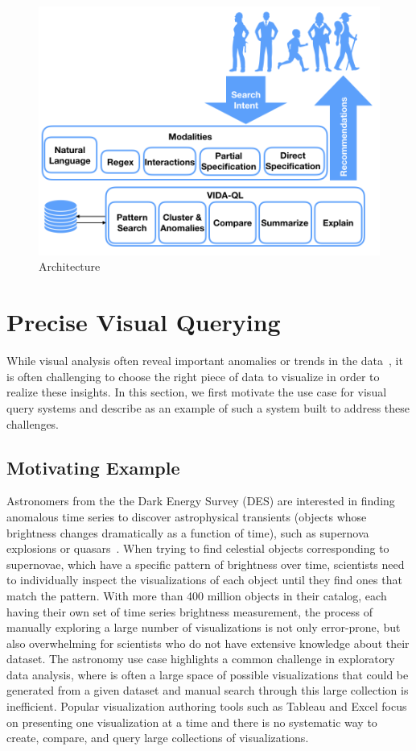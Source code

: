 \begin{figure}[h!]
\label{fig:cycle}
\centering
\includegraphics[width=0.5\linewidth]{figures/VIDA_architecture.png}
\caption{\vida Architecture}
\end{figure}
\section{Precise Visual Querying}\label{sec:precise}
While visual analysis often reveal important anomalies or trends in the data~\cite{Heer2012,Morton2014}, it is often challenging to choose the right piece of data to visualize in order to realize these insights. In this section, we first motivate the use case for visual query systems and describe \zv as an example of such a system built to address these challenges.
\subsection{Motivating Example}
Astronomers from the the Dark Energy Survey (DES) are interested in finding anomalous time series to discover astrophysical transients (objects whose brightness changes dramatically as a function of time), such as supernova explosions or quasars~\cite{Drlica-Wagner2017}. When trying to find celestial objects corresponding to supernovae, which have a specific pattern of brightness over time, scientists need to individually inspect the visualizations of each object until they find ones that match the pattern. With more than 400 million objects in their catalog, each having their own set of time series brightness measurement, the process of manually exploring a large number of visualizations is not only error-prone, but also overwhelming for scientists who do not have extensive knowledge about their dataset. The astronomy use case highlights a common challenge in exploratory data analysis, where is often a large space of possible visualizations that could be generated from a given dataset and manual search through this large collection is inefficient. Popular visualization authoring tools such as Tableau and Excel focus on presenting one visualization at a time and there is no systematic way to create, compare, and query large collections of visualizations. 
